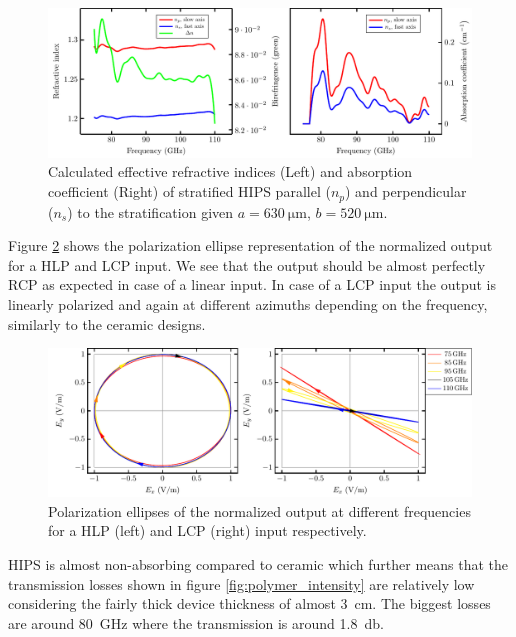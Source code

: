 \begin{figure}[H]
    \centering
    \includegraphics[scale=0.7]{images/results/plots/polymer/effective_ri_bf.pdf}
    \caption{Calculated effective refractive indices (Left) and absorption coefficient (Right) of stratified HIPS parallel ($n_p$) and perpendicular ($n_s$) to the stratification given $a=\SI{630}{\micro \meter}$, $b=\SI{520}{\micro \meter}$.}
    \label{fig:effective_ri_bf_hips}
\end{figure}

Figure \ref{fig:polymer_pe_lp} shows the polarization ellipse representation of the normalized output for a HLP and LCP input. We see that the output should be almost perfectly RCP as expected in case of a linear input. In case of a LCP input the output is linearly polarized and again at different azimuths depending on the frequency, similarly to the  ceramic designs. 

\begin{figure}[H]
    \centering
    \includegraphics[scale=0.7]{images/results/plots/polymer/pe_lp.pdf}
    \caption{Polarization ellipses of the normalized output at different frequencies for a HLP (left) and LCP (right) input respectively.}
    \label{fig:polymer_pe_lp}
\end{figure}

HIPS is almost non-absorbing compared to  ceramic which further means that the transmission losses shown in figure \ref{fig:polymer_intensity} are relatively low considering the fairly thick device thickness of almost \SI{3}{\centi \meter}. The biggest losses are around \SI{80}{\giga \hertz} where the transmission is around \SI{1.8}{\decibel}.

